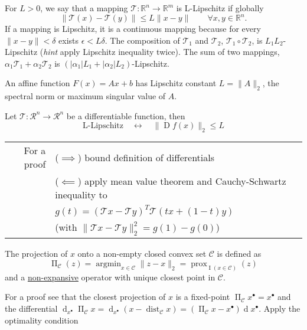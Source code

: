 \documentclass{article}
\DeclareMathOperator{\prox}{prox}
\DeclareMathOperator*{\argmin}{argmin}
\DeclareMathOperator{\jacobian}{D}
\DeclareMathOperator{\proj}{\Pi}
\DeclareMathOperator{\indicator}{I}
\DeclareMathOperator{\diff}{d}
\DeclareMathOperator{\dist}{dist}
\newcommand*\from{\colon}
\newcommand{\optimal}[1]{{#1^{\scriptscriptstyle\bullet}}}
\begin{document}
\begin{definition}[label=5nalj3hx, name=Lipschitz Regularity]
	For \( L > 0 \), we say that a mapping \( \mathcal T\from\mathbb R^n\to\mathbb R^m \) is L-Lipschitz if globally
	\[
		\lVert \mathcal T(x) - \mathcal T(y) \rVert \leq L\lVert x - y\rVert \qquad \forall x,y\in\mathbb R^n.
	\]
	If a mapping is Lipschitz, it is a continuous mapping because for every
	\( \lVert x - y \rVert < \delta \) exists \( \epsilon < L \delta \). The composition of \( \mathcal T_1 \) and \( \mathcal T_2 \), 
	\( \mathcal T_1 \circ \mathcal T_2 \), is \( L_1L_2 \)-Lipschitz (\textit{hint} apply Lipschitz inequality twice).
	The sum of two mappings, \( \alpha_1\mathcal T_1 + \alpha_2\mathcal T_2 \) is \((|\alpha_1|L_1 + |\alpha_2|L_2)\)-Lipschitz.

	\begin{example}[label=17vzrkyq, name=Affine Function]
		An affine function \(F(x) = Ax + b\) has Lipschitz constant \(L=\lVert A\rVert_2\), 
		the spectral norm or maximum singular value of \(A\).
	\end{example}

	\begin{example}[label=jydhwyqa, name=Differentiable Function]
		Let \( \mathcal T\from\mathcal R^n\to\mathcal R^n\) be a differentiable function, then 
		\[
			\text{L-Lipschitz} \quad \leftrightarrow \quad \lVert\jacobian f(x)\rVert_2 \leq L
		\]

		\begin{tabular}{rl}
			For a proof & (\( \implies \)) bound definition of differentials \\
				    & (\( \impliedby \)) apply mean value
				    theorem and Cauchy-Schwartz inequality to \\
				    &\quad\(g(t) = (\mathcal Tx - \mathcal Ty)^T\mathcal T(tx + (1-t) y) \)\\
				    &\quad(with \(\lVert\mathcal Tx - \mathcal Ty\rVert^2_2 = g(1) - g(0)\))
		\end{tabular}
	\end{example}

	\begin{example}[label=5pxh2ufj, name=Projections]
		The projection of \(x\) onto a non-empty closed convex set \(
		\mathcal C\) is defined as 
		\[
			\proj_{\mathcal C}(z) = \argmin_{x\in\mathcal C}\lVert z
			-x\rVert_2 = \prox_{\indicator(x\in\mathcal C)}(z)
		\]
		and a \hyperref[2s6tfa1j]{non-expansive} operator with unique
		closest point in \( \mathcal C\).

		For a proof see that the closest projection of \(x\) is a
		fixed-point \(\proj_{\mathcal C}\optimal{x} = \optimal{x}\) and
		the differential \( \diff_{\optimal{x}}\proj_{\mathcal C}x =
		\diff_{\optimal{x}}(x - \dist_{\mathcal C}x) = (\proj_{\mathcal C}x
		- \optimal{x})\diff\optimal{x} \). Apply the optimality
		condition 


\end{example}
\end{definition}
\end{document}
